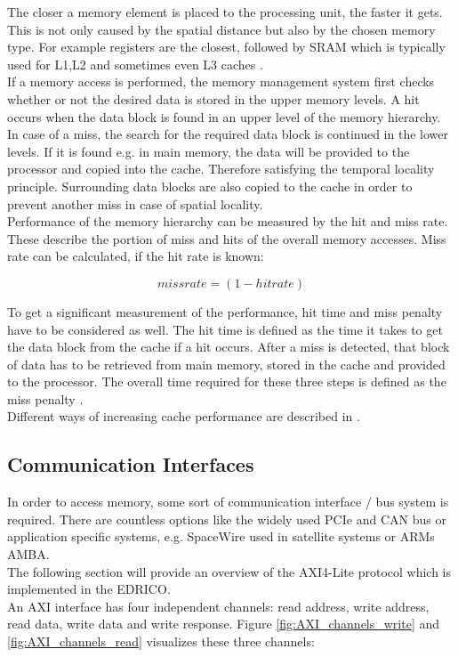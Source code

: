 The closer a memory element is placed to the processing unit, the faster it gets. This is not only caused by the spatial distance but also by the chosen memory type. For example registers are the closest, followed by SRAM which is typically used for L1,L2 and sometimes even L3 caches \cite{patterson:2017}.\\
If a memory access is performed, the memory management system first checks whether or not the desired data is stored in the upper memory levels. A hit occurs when the data block is found in an upper level of the memory hierarchy. In case of a miss, the search for the required data block is continued in the lower levels. If it is found e.g. in main memory, the data will be provided to the processor and copied into the cache. Therefore satisfying the temporal locality principle. Surrounding data blocks are also copied to the cache in order to prevent another miss in case of spatial locality.\\
Performance of the memory hierarchy can be measured by the hit and miss rate. These describe the portion of miss and hits of the overall memory accesses. Miss rate can be calculated, if the hit rate is known:

$$miss rate = (1 - hit rate)$$

To get a significant measurement of the performance, hit time and miss penalty have to be considered as well. The hit time is defined as the time it takes to get the data block from the cache if a hit occurs. After a miss is detected, that block of data has to be retrieved from main memory, stored in the cache and provided to the processor. The overall time required for these three steps is defined as the miss penalty \cite{patterson:2017}.\\
Different ways of increasing cache performance are described in \cite{patterson:2017}.\\


\subsection{Communication Interfaces}
In order to access memory, some sort of communication interface / bus system is required. There are countless options like the widely used \ac{PCIe} and \ac{CAN} bus or application specific systems, e.g. SpaceWire used in satellite systems or \acp{ARM} \ac{AMBA}.\\
The following section will provide an overview of the \ac{AXI4-Lite} protocol which is implemented in the \ac{EDRICO}.\\
An AXI interface has four independent channels: read address, write address, read data, write data and write response. Figure \ref{fig:AXI_channels_write} and \ref{fig:AXI_channels_read} visualizes these three channels:

